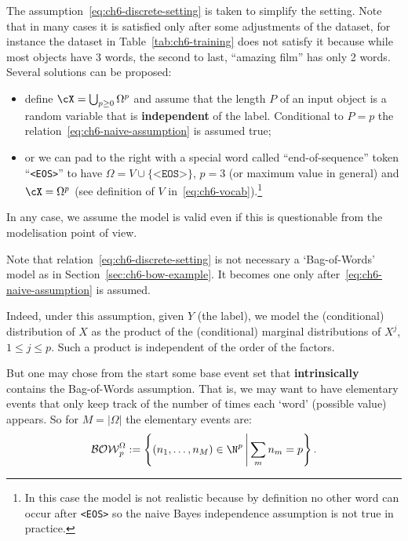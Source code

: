 \begin{warning}
The assumption~\eqref{eq:ch6-discrete-setting} is taken to simplify the
setting. Note that in many cases it is satisfied only after some adjustments
of the dataset, for instance the dataset in Table~\ref{tab:ch6-training} does
not satisfy it because while most objects have 3 words, the second to last,
``amazing film'' has only 2 words. Several solutions can be proposed:
\begin{itemize}
  \item define $\cX=\bigcup_{p\ge 0}\Omega^{p}$ and assume that the length
        $P$ of an input object is a random variable that is
        \textbf{independent} of the label. Conditional to $P=p$ the
        relation~\eqref{eq:ch6-naive-assumption} is assumed true;
  \item or we can pad to the right with a special word called
        ``end-of-sequence'' token ``\texttt{<EOS>}'' to have
        $\Omega=V\cup\{\texttt{<EOS>}\}$, $p=3$ (or maximum value in general)
        and $\cX=\Omega^{p}$ (see definition of $V$
        in~\eqref{eq:ch6-vocab}).\footnote{In this case the model is not
        realistic because by definition no other word can occur after
        \texttt{<EOS>} so the naive Bayes independence assumption is not true
        in practice.}
\end{itemize}
In any case, we assume the model is valid even if this is questionable
from the modelisation point of view.
\end{warning}

Note that relation~\eqref{eq:ch6-discrete-setting} is not necessary a
`Bag-of-Words' model as in Section~\ref{sec:ch6-bow-example}. It becomes one
only after~\eqref{eq:ch6-naive-assumption} is assumed.

Indeed, under this assumption, given $Y$ (the label), we model the
(conditional) distribution of $X$ as the product of the (conditional) marginal
distributions of $X^{j}$, $1\le j\le p$. Such a product is independent of the
order of the factors.

But one may chose from the start some base event set that \textbf{intrinsically}
contains the Bag-of-Words assumption. That is, we may want to have elementary
events that only keep track of the number of times each `word' (possible
value) appears. So for $M=|\Omega|$ the elementary events are:
\begin{equation}\label{eq:ch6-bow-space}
  \mathcal{BOW}_{p}^{\Omega}:=\left\{(n_{1},\dots,n_{M})\in\N^{p}
    \,\middle|\,\sum_{m}n_{m}=p\right\}.
\end{equation}

